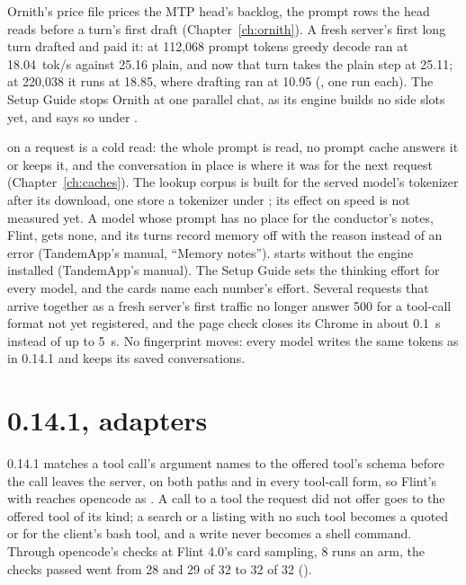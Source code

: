 Ornith's price file prices the MTP head's backlog, the prompt rows the head reads before a turn's first draft (Chapter~\ref{ch:ornith}). A fresh server's first long turn drafted and paid it: at 112,068 prompt tokens greedy decode ran at 18.04~tok/s against 25.16 plain, and now that turn takes the plain step at 25.11; at 220,038 it runs at 18.85, where drafting ran at 10.95 (\measured, one run each). The Setup Guide stops Ornith at one parallel chat, as its engine builds no side slots yet, and  says so under .

 on a request is a cold read: the whole prompt is read, no prompt cache answers it or keeps it, and the conversation in place is where it was for the next request (Chapter~\ref{ch:caches}). The lookup corpus is built for the served model's tokenizer after its download, one store a tokenizer under ; its effect on speed is not measured yet. A model whose prompt has no place for the conductor's notes, Flint, gets none, and its turns record memory off with the reason instead of an error (TandemApp's manual, \enquote{Memory notes}).  starts without the engine installed (TandemApp's manual). The Setup Guide sets the thinking effort for every model, and the cards name each number's effort. Several requests that arrive together as a fresh server's first traffic no longer answer 500 for a tool-call format not yet registered, and the page check closes its Chrome in about 0.1~s instead of up to 5~s. No fingerprint moves: every model writes the same tokens as in 0.14.1 and keeps its saved conversations.

\section{0.14.1, adapters}\label{sec:changelog-0141}

0.14.1 matches a tool call's argument names to the offered tool's schema before the call leaves the server, on both paths and in every tool-call form, so Flint's  with  reaches opencode as . A call to a tool the request did not offer goes to the offered tool of its kind; a search or a listing with no such tool becomes a quoted  or  for the client's bash tool, and a write never becomes a shell command. Through opencode's checks at Flint 4.0's card sampling, 8 runs an arm, the checks passed went from 28 and 29 of 32 to 32 of 32 (\measured).


